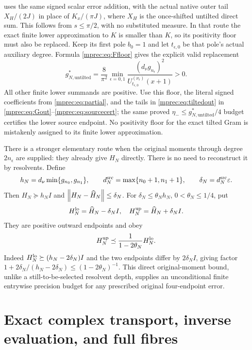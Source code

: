 \documentclass[11pt]{article}
\begin{document}
uses the same signed scalar error addition, with the actual native
outer tail $X_H/(2J)$ in place of $K_x/(\pi J)$, where $X_H$
is the once-shifted untilted direct sum. This follows from
$s\le\pi/2$, with no substituted measure. In that route the
exact finite lower approximation to $K$ is smaller than $K$,
so its positivity floor must also be replaced. Keep its first
pole $b_0=1$ and let $t_{\epsilon,0}$ be that pole's actual
auxiliary degree. Formula \eqref{mprec:eq:Ffloor} gives the explicit
valid replacement
\[
 g_{N,\mathrm{untilted}}^*
 =\frac8{\pi^2}\min_{\epsilon=0,1}
 \frac{(d_\nu g_{n_\epsilon})^2}
 {U_{t_{\epsilon,0}}^{(\nu_\epsilon)}(x+1)}>0.
\]
All other finite lower summands are positive. Use this floor,
the literal signed coefficients from \eqref{mprec:eq:partial}, and
the tails in \eqref{mprec:eq:tiltedout} in
\eqref{mprec:eq:Gout}--\eqref{mprec:eq:sourcecert}; the same proved
$\eta_-\le g_{N,\mathrm{untilted}}^*/4$ budget certifies the
lower source endpoint. No positivity floor for the exact tilted
Gram is mistakenly assigned to its finite lower approximation.

There is a stronger elementary route when the original moments
through degree $2n_\epsilon$ are supplied: they already give
$H_N$ directly. There is no need to reconstruct it by resolvents.
Define
\begin{equation}\label{mprec:eq:directconstants}
 h_N=d_\nu\min\{g_{n_0},g_{n_1}\},\qquad
 d_N^{\rm src}=\max\{n_0+1,n_1+1\},\qquad
 \delta_N=d_N^{\rm src}\varepsilon.
\end{equation}
Then $H_N\succeq h_NI$ and $\left\lVert H_N-\widehat H_N\right\rVert\le\delta_N$.
For $\delta_N\le\theta_Nh_N$, $0<\theta_N\le1/4$, put
\begin{equation}\label{mprec:eq:directout}
 H_N^{\rm lo}=\widehat H_N-\delta_NI,\quad
 H_N^{\rm up}=\widehat H_N+\delta_NI.
\end{equation}
They are positive outward endpoints and obey
\begin{equation}\label{mprec:eq:directrelative}
 H_N^{\rm up}\preceq\frac1{1-2\theta_N}H_N^{\rm lo}.
\end{equation}
Indeed $H_N^{\rm lo}\succeq(h_N-2\delta_N)I$ and the two
endpoints differ by $2\delta_NI$, giving factor
$1+2\delta_N/(h_N-2\delta_N)\le(1-2\theta_N)^{-1}$.
This direct original-moment bound, unlike a still-to-be-selected
resolvent depth, supplies an unconditional finite entrywise
precision budget for any prescribed original four-endpoint error.

\section{Exact complex transport, inverse evaluation, and full fibres}
\end{document}
